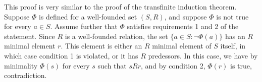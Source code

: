 \documentclass[12pt]{article}
\begin{document}
This proof is very similar to the proof of the transfinite induction theorem.  Suppose $\Phi$ is defined for a well-founded set $(S,R)$, and suppose $\Phi$ is not true for every $a\in S$.  Assume further that $\Phi$ satisfies requirements 1 and 2 of the statement.  Since $R$ is a well-founded relation, the set $\{a\in S:\neg\Phi(a)\}$ has an $R$ minimal element $r$.  This element is either an $R$ minimal element of $S$ itself, in which case condition 1 is violated, or it has $R$ predessors.  In this case, we have by minimality $\Phi(s)$ for every $s$ such that $sRr$, and by condition 2, $\Phi(r)$ is true, contradiction.
\end{document}
